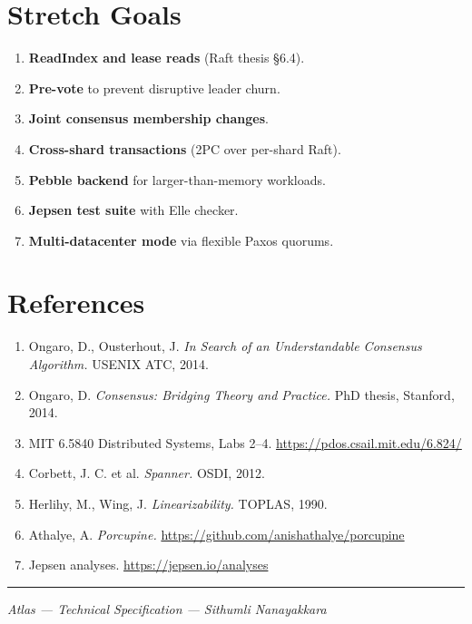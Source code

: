 \documentclass[11pt,a4paper]{article}
\begin{document}
\section{Stretch Goals}

\begin{enumerate}[leftmargin=1.5em,itemsep=0.2em]
  \item \textbf{ReadIndex and lease reads} (Raft thesis \S6.4).
  \item \textbf{Pre-vote} to prevent disruptive leader churn.
  \item \textbf{Joint consensus membership changes}.
  \item \textbf{Cross-shard transactions} (2PC over per-shard Raft).
  \item \textbf{Pebble backend} for larger-than-memory workloads.
  \item \textbf{Jepsen test suite} with Elle checker.
  \item \textbf{Multi-datacenter mode} via flexible Paxos quorums.
\end{enumerate}

\section{References}

\begin{enumerate}[leftmargin=1.5em,itemsep=0.2em]
  \item Ongaro, D., Ousterhout, J. \textit{In Search of an Understandable Consensus Algorithm.} USENIX ATC, 2014.
  \item Ongaro, D. \textit{Consensus: Bridging Theory and Practice.} PhD thesis, Stanford, 2014.
  \item MIT 6.5840 Distributed Systems, Labs 2--4. \url{https://pdos.csail.mit.edu/6.824/}
  \item Corbett, J. C. et al. \textit{Spanner.} OSDI, 2012.
  \item Herlihy, M., Wing, J. \textit{Linearizability.} TOPLAS, 1990.
  \item Athalye, A. \textit{Porcupine.} \url{https://github.com/anishathalye/porcupine}
  \item Jepsen analyses. \url{https://jepsen.io/analyses}
\end{enumerate}

\vspace{2em}\hrule\vspace{0.5em}
\begin{center}\small\color{muted}\textit{Atlas --- Technical Specification --- Sithumli Nanayakkara}\end{center}
\end{document}
